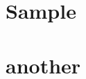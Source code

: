 \documentclass{book}
\begin{document}
\chapter{Sample}




\lipsum[1-4]

\chapter{another}
\lipsum[1-2]
\end{document}
